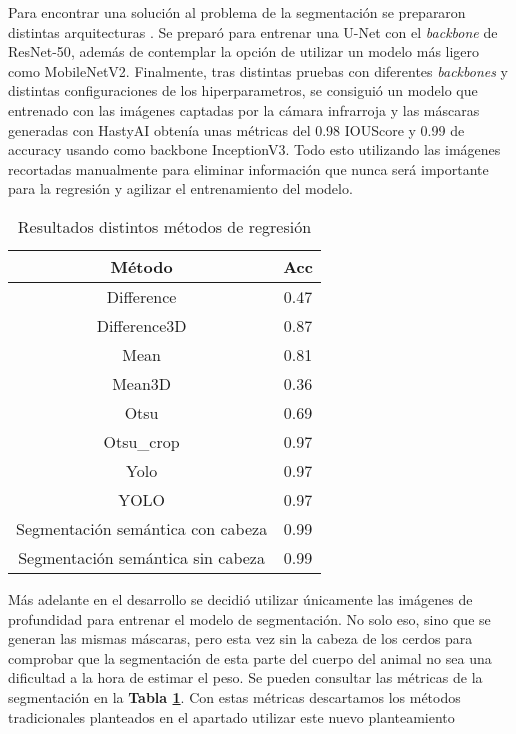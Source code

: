 ﻿\documentclass[10pt,a4paper,twocolumn,twoside]{article}
\begin{document}
    Para encontrar una solución al problema de la segmentación se prepararon distintas arquitecturas . Se preparó para entrenar una U-Net\cite{unet} con el \textit{backbone} de ResNet-50\cite{resnet}, además de contemplar la opción de utilizar un modelo más ligero como MobileNetV2\cite{mobilenet}.
    Finalmente, tras distintas pruebas con diferentes \textit{backbones} y distintas configuraciones de los hiperparametros, se consiguió un modelo que entrenado con las imágenes captadas por la cámara infrarroja y las máscaras generadas con HastyAI\cite{hasty} obtenía unas métricas del 0.98 IOUScore\cite{iou} y 0.99 de accuracy usando como backbone InceptionV3\cite{inception}. Todo esto utilizando las imágenes recortadas manualmente para eliminar información que nunca será importante para la regresión y agilizar el entrenamiento del modelo.
\begin{table}[!b]
 \centering
\begin{tabular}{|c|c|}
\hline
\textbf{Método}          & \textbf{Acc} \\ \hline
Difference   & 0.47 \\ \hline
Difference3D & 0.87 \\ \hline
Mean         & 0.81 \\ \hline
Mean3D       & 0.36 \\ \hline
Otsu         & 0.69 \\ \hline
Otsu\_crop   & 0.97 \\ \hline
Yolo         & 0.97 \\ \hline
YOLO             & 0.97          \\ \hline
Segmentación semántica con cabeza  & 0.99          \\ \hline
Segmentación semántica  sin cabeza  & 0.99          \\ \hline
\end{tabular}
\caption{Resultados distintos métodos de regresión}
\label{resultadosSeg}
\end{table}

Más adelante en el desarrollo se decidió utilizar únicamente las imágenes de profundidad para entrenar el modelo de segmentación. No solo eso, sino que se generan las mismas máscaras, pero esta vez sin la cabeza de los cerdos para comprobar que la segmentación de esta parte del cuerpo del animal no sea una dificultad a la hora de estimar el peso. Se pueden consultar las métricas de la segmentación en la \textbf{Tabla \ref{resultadosSeg}}. Con estas métricas descartamos los métodos tradicionales planteados en el apartado utilizar este nuevo planteamiento
    
\end{document}
